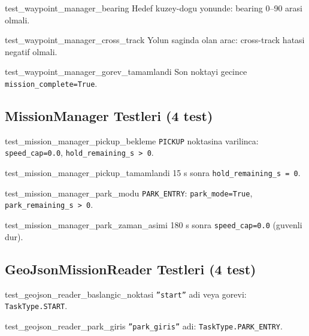 \documentclass[a4paper,12pt]{article}
\begin{document}
\begin{testbox}{test\_waypoint\_manager\_bearing}
Hedef kuzey-dogu yonunde: bearing 0--90 arasi olmali.
\end{testbox}

\begin{testbox}{test\_waypoint\_manager\_cross\_track}
Yolun saginda olan arac: cross-track hatasi negatif olmali.
\end{testbox}

\begin{testbox}{test\_waypoint\_manager\_gorev\_tamamlandi}
Son noktayi gecince \texttt{mission\_complete=True}.
\end{testbox}

\subsection{MissionManager Testleri (4 test)}

\begin{testbox}{test\_mission\_manager\_pickup\_bekleme}
\texttt{PICKUP} noktasina varilinca: \texttt{speed\_cap=0.0},
\texttt{hold\_remaining\_s > 0}.
\end{testbox}

\begin{testbox}{test\_mission\_manager\_pickup\_tamamlandi}
15 s sonra \texttt{hold\_remaining\_s = 0}.
\end{testbox}

\begin{testbox}{test\_mission\_manager\_park\_modu}
\texttt{PARK\_ENTRY}: \texttt{park\_mode=True}, \texttt{park\_remaining\_s > 0}.
\end{testbox}

\begin{testbox}{test\_mission\_manager\_park\_zaman\_asimi}
180 s sonra \texttt{speed\_cap=0.0} (guvenli dur).
\end{testbox}

\subsection{GeoJsonMissionReader Testleri (4 test)}

\begin{testbox}{test\_geojson\_reader\_baslangic\_noktasi}
\texttt{''start''} adi veya gorevi: \texttt{TaskType.START}.
\end{testbox}

\begin{testbox}{test\_geojson\_reader\_park\_giris}
\texttt{''park\_giris''} adi: \texttt{TaskType.PARK\_ENTRY}.
\end{testbox}
\end{document}
